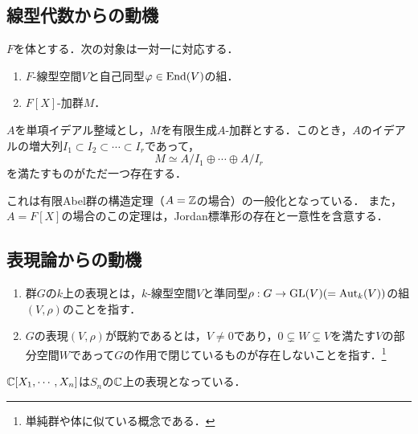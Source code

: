 \documentclass[uplatex,dvipdfmx]{jsreport}
\begin{document}
\subsection{線型代数からの動機}

\begin{proposition}[線型空間の自己同型の問題を解決するにはその係数の多項式の加群の理論を構築すれば良い]
    $F$を体とする．次の対象は一対一に対応する．
    \begin{enumerate}
        \item $F$-線型空間$V$と自己同型$\varphi\in\mathrm{End}(V)$の組．
        \item $F[X]$-加群$M$．
    \end{enumerate}
\end{proposition}

\begin{theorem}[単項イデアル整域上の有限生成加群の構造定理]
    $A$を単項イデアル整域とし，$M$を有限生成$A$-加群とする．このとき，$A$のイデアルの増大列$I_1\subset I_2\subset\cdots\subset I_r$であって，
    \[M\simeq A/I_1\oplus\cdots\oplus A/I_r\]
    を満たすものがただ一つ存在する．
\end{theorem}
\begin{remarks}
    これは有限Abel群の構造定理（$A=\mathbb{Z}$の場合）の一般化となっている．
    また，$A=F[X]$の場合のこの定理は，Jordan標準形の存在と一意性を含意する．
\end{remarks}

\subsection{表現論からの動機}

\begin{definition}\mbox{}
    \begin{enumerate}
        \item 群$G$の$k$上の表現とは，$k$-線型空間$V$と準同型$\rho:G\to\mathrm{GL}(V)(=\mathrm{Aut}_k(V))$の組$(V,\rho)$のことを指す．
        \item $G$の表現$(V,\rho)$が既約であるとは，$V\ne 0$であり，$0\subsetneq W\subsetneq V$を満たす$V$の部分空間$W$であって$G$の作用で閉じているものが存在しないことを指す．\footnote{単純群や体に似ている概念である．}
    \end{enumerate}
\end{definition}
\begin{example}
    $\mathbb{C}[X_1,\cdots,X_n]$は$S_n$の$\mathbb{C}$上の表現となっている．
\end{example}
\end{document}
